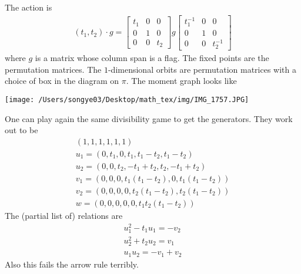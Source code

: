 \documentclass[12pt]{article}
\begin{document}
\begin{example}
    The action is \begin{align*}
        (t_1,t_2)\cdot g = \begin{bmatrix}
            t_1 & 0 & 0 \\
            0 & 1 & 0 \\
            0 & 0 & t_2
        \end{bmatrix}g\begin{bmatrix}
            t_1^{-1} & 0 & 0 \\
            0 & 1 & 0 \\
            0 & 0 & t_2^{-1}
        \end{bmatrix}
    \end{align*} where $g$ is a matrix whose column span is a flag. The fixed points are the permutation matrices.
    The $1$-dimensional orbits are permutation matrices with a choice of box in the diagram on $\pi$. 
    The moment graph looks like 
    \begin{center}
    \texttt{[image: /Users/songye03/Desktop/math\_tex/img/IMG\_1757.JPG]}
    \end{center}
    One can play again the same divisibility game to get the generators. 
    They work out to be \begin{align*}
        (1,1,1,1,1,1) \\
        u_1 = (0,t_1,0,t_1,t_1-t_2,t_1 - t_2) \\ 
        u_2 = (0,0,t_2,-t_1 + t_2,t_2,-t_1 + t_2) \\ 
        v_1 = (0,0,0,t_1(t_1- t_2),0,t_1(t_1- t_2)) \\ 
        v_2 = (0,0,0,0,t_2(t_1 - t_2),t_2(t_1 - t_2)) \\ 
        w = (0,0,0,0,0,t_1t_2(t_1-t_2))
    \end{align*} 
    The (partial list of) relations are \begin{align*}
        u_1^2 - t_1u_1 = -v_2 \\ 
        u_2^2 + t_2u_2 = v_1 \\ 
        u_1u_2 = -v_1 + v_2
    \end{align*} 
    Also this fails the arrow rule terribly.
\end{example}
\end{document}
